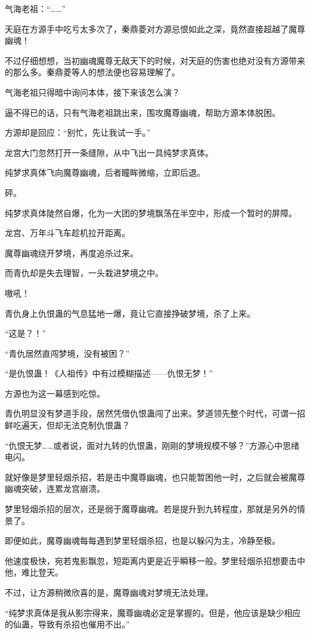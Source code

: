 \begin{this_body}
气海老祖：“……”

天庭在方源手中吃亏太多次了，秦鼎菱对方源忌恨如此之深，竟然直接超越了魔尊幽魂！

不过仔细想想，当初幽魂魔尊无敌天下的时候，对天庭的伤害也绝对没有方源带来的那么多。秦鼎菱等人的想法便也容易理解了。

气海老祖只得暗中询问本体，接下来该怎么演？

逼不得已的话，只有气海老祖跳出来，围攻魔尊幽魂，帮助方源本体脱困。

方源却是回应：“别忙，先让我试一手。”

龙宫大门忽然打开一条缝隙，从中飞出一具纯梦求真体。

纯梦求真体飞向魔尊幽魂，后者瞳眸微缩，立即后退。

砰。

纯梦求真体陡然自爆，化为一大团的梦境飘荡在半空中，形成一个暂时的屏障。

龙宫、万年斗飞车趁机拉开距离。

魔尊幽魂绕开梦境，再度追杀过来。

而青仇却是失去理智，一头栽进梦境之中。

嗷吼！

青仇身上仇恨蛊的气息猛地一爆，竟让它直接挣破梦境，杀了上来。

“这是？！”

“青仇居然直闯梦境，没有被困？”

“是仇恨蛊！《人祖传》中有过模糊描述——仇恨无梦！”

方源也为这一幕感到吃惊。

青仇明显没有梦道手段，居然凭借仇恨蛊闯了出来。梦道领先整个时代，可谓一招鲜吃遍天，但却无法克制仇恨蛊？

“仇恨无梦……或者说，面对九转的仇恨蛊，刚刚的梦境规模不够？”方源心中思绪电闪。

就好像是梦里轻烟杀招，若是击中魔尊幽魂，也只能暂困他一时，之后就会被魔尊幽魂突破，连累龙宫崩溃。

梦里轻烟杀招的层次，还是弱于魔尊幽魂。若是提升到九转程度，那就是另外的情景了。

即便如此，魔尊幽魂每每遇到梦里轻烟杀招，也是以躲闪为主，冷静至极。

他速度极快，宛若鬼影飘忽，短距离内更是近乎瞬移一般。梦里轻烟杀招想要击中他，难比登天。

不过，让方源稍微欣喜的是，魔尊幽魂对梦境无法处理。

“纯梦求真体是我从影宗得来，魔尊幽魂必定是掌握的。但是，他应该是缺少相应的仙蛊，导致有杀招也催用不出。”


\end{this_body}
